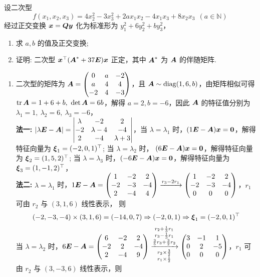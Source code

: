 \begin{example}
    设二次型 $$f(x_1,x_2,x_3)=4x_2^2-3x_3^2+2ax_1x_2-4x_1x_3+8x_2x_3~~(a\in\mathbb{N})$$
    经过正交变换 $\vb*{x}=\vb*{Qy}$ 化为标准形为 $y_1^2+6y_2^2+by_3^2$，
    \begin{enumerate}[label=(\arabic{*})]
        \item 求 $a,b$ 的值及正交变换;
        \item 证明: 二次型 $\vb*{x}^\top\qty(\vb*{A}^*+37\vb*{E})\vb*{x}$ 正定，其中 $\vb*{A}^*$ 为 $\vb*{A}$ 的伴随矩阵.
    \end{enumerate}
\end{example}
\begin{solution}
    \begin{enumerate}[label=(\arabic{*})]
        \item 二次型的矩阵为 $\vb*{A}=\mqty(0&a&-2\\a&4&4\\-2&4&-3)$，且 $\vb*{A}\sim\mathrm{diag}(1,6,b)$，由矩阵相似可得 $\tr\vb*{A}=1+6+b,~\det\vb*{A}=6b$，解得 $a=2,b=-6$，因此 $\vb*{A}$ 的特征值分别为 $\lambda_1=1,~\lambda_2=6,~\lambda_3=-6$，\\
              \textbf{法一: }$|\lambda\vb*{E}-\vb*{A}|=\mqty|\lambda&-2&2\\-2&\lambda-4&-4\\2&-4&\lambda+3|$，当 $\lambda=\lambda_1$ 时，$\qty(1\vb*{E}-\vb*{A})\vb*{x}=\vb*{0}$，解得特征向量为 $\vb*{\xi}_1=(-2,0,1)^\top$; 当 $\lambda=\lambda_2$ 时，
              $(6\vb*{E}-\vb*{A})\vb*{x}=\vb*{0}$，解得特征向量为 $\vb*{\xi}_2=(1,5,2)^\top$; 当 $\lambda=\lambda_3$ 时，$(-6\vb*{E}-\vb*{A})\vb*{x}=\vb*{0}$，解得特征向量为 $\vb*{\xi}_3=(1,-1,2)^\top$，\\
              \textbf{法二: }$\lambda=\lambda_1$ 时，$1\vb*{E}-\vb*{A}=\mqty(1&-2&2\\-2&-3&-4\\2&-4&4)\xrightarrow{r_3-2r_1}\mqty(1&-2&2\\-2&-3&-4\\0&0&0)$，$r_1$ 可由 $r_2$ 与 $(3,1,6)$ 线性表示，
              则 $$(-2,-3,-4)\times(3,1,6)=(-14,0,7)\Rightarrow (-2,0,1)\Rightarrow \vb*{\xi}_1=(-2,0,1)^\top$$
              当 $\lambda=\lambda_2$ 时，$6\vb*{E}-\vb*{A}=\mqty(6&-2&2\\-2&2&-4\\2&-4&9)\xrightarrow[\substack{r_2\times\frac{3}{2}\\r_1\times\frac{1}{2}}]{\substack{r_2+\frac{1}{3}r_1\\r_3-\frac{1}{3}r_1\\\frac{3}{5}r_3+\frac{3}{2}r_2}}\mqty(3&-1&1\\0&2&-5\\0&0&0)$，$r_1$ 可由 $r_2$ 与 $(3,-3,6)$ 线性表示，则

\end{enumerate}
\end{solution}
